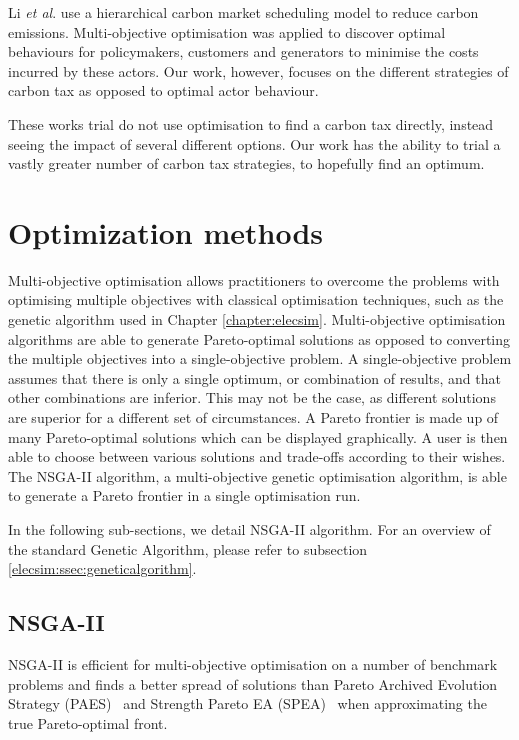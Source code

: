 Li \textit{et al}.  \cite{Li2017} use a hierarchical carbon market scheduling model to reduce carbon emissions. Multi-objective optimisation was applied to discover optimal behaviours for policymakers, customers and generators to minimise the costs incurred by these actors. Our work, however, focuses on the different strategies of carbon tax as opposed to optimal actor behaviour.

These works trial do not use optimisation to find a carbon tax directly, instead seeing the impact of several different options. Our work has the ability to trial a vastly greater number of carbon tax strategies, to hopefully find an optimum.


\section{Optimization methods}
\label{carbonoptim:sec:optimisation}

Multi-objective optimisation allows practitioners to overcome the problems with optimising multiple objectives with classical optimisation techniques, such as the genetic algorithm used in Chapter \ref{chapter:elecsim}. Multi-objective optimisation algorithms are able to generate Pareto-optimal solutions as opposed to converting the multiple objectives into a single-objective problem. A single-objective problem assumes that there is only a single optimum, or combination of results, and that other combinations are inferior. This may not be the case, as different solutions are superior for a different set of circumstances. A Pareto frontier is made up of many Pareto-optimal solutions which can be displayed graphically. A user is then able to choose between various solutions and trade-offs according to their wishes. The NSGA-II algorithm, a multi-objective genetic optimisation algorithm, is able to generate a Pareto frontier in a single optimisation run. 

In the following sub-sections, we detail NSGA-II algorithm. For an overview of the standard Genetic Algorithm, please refer to subsection \ref{elecsim:ssec:geneticalgorithm}.



\subsection{NSGA-II}


NSGA-II \cite{Valkanas2014} is efficient for multi-objective optimisation on a number of benchmark problems and finds a better spread of solutions than Pareto Archived Evolution Strategy (PAES)~\cite{Knowles1999} and Strength Pareto EA (SPEA)~\cite{Zitzler2006} when approximating the true Pareto-optimal front.

